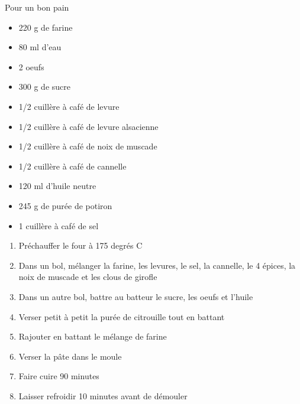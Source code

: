 \bigskip
{}
{Pour un bon pain}{\begin{itemize}
	\item 220 g de farine 
	\item 80 ml d'eau 
	\item 2 oeufs
	\item 300 g de sucre 
	\item 1/2 cuillère à café de levure
	\item 1/2 cuillère à café de levure alsacienne
	\item 1/2 cuillère à café de noix de muscade
	\item 1/2 cuillère à café de cannelle
	\item 120 ml d'huile neutre
	\item 245 g de purée de potiron
	\item 1 cuillère à café de sel
\end{itemize}}
{\phantom{.}

\bigskip
\begin{enumerate}
	\item Préchauffer le four à 175 degrés C 
	\item Dans un bol, mélanger la farine, les levures, le sel, la cannelle, le 4 épices, la noix de muscade et les clous de girofle
	\item Dans un autre bol, battre au batteur le sucre, les oeufs et l'huile
	\item Verser petit à petit la purée de citrouille tout en battant
	\item Rajouter en battant le mélange de farine
	\item Verser la pâte dans le moule
	\item Faire cuire 90 minutes
	\item Laisser refroidir 10 minutes avant de démouler
\end{enumerate}

\bigskip
\phantom{.}}

